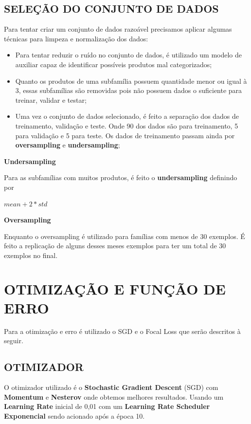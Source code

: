 \subsection{SELEÇÃO DO CONJUNTO DE DADOS}

Para tentar criar um conjunto de dados razoável precisamos aplicar algumas técnicas para limpeza e normalização dos dados:

\begin{itemize}
\item Para tentar reduzir o ruído no conjunto de dados, é utilizado um modelo de auxiliar capaz de identificar possíveis produtos mal categorizados;
\item Quanto os produtos de uma subfamília possuem quantidade menor ou igual à 3, essas subfamílias são removidas pois não possuem dados o suficiente para treinar, validar e testar;
\item Uma vez o conjunto de dados selecionado, é feito a separação dos dados de treinamento, validação e teste. Onde 90 dos dados são para treinamento, 5 para validação e 5 para teste. Os dados de treinamento passam ainda por \textbf{oversampling} e \textbf{undersampling};
\end{itemize}

\textbf{Undersampling}

Para as subfamílias com muitos produtos, é feito o \textbf{undersampling} definindo por

\begin{center}
    $mean + 2 * std$
\end{center}

\textbf{Oversampling}

Enquanto o oversampling é utilizado para famílias com menos de 30 exemplos. É feito a replicação de alguns desses meses exemplos para ter um total de 30 exemplos no final.

\section{OTIMIZAÇÃO E FUNÇÃO DE ERRO}

Para a otimização e erro é utilizado o SGD e o Focal Loss que serão descritos à seguir.

\subsection{OTIMIZADOR}

O otimizador utilizado é o \textbf{Stochastic Gradient Descent} (SGD) com \textbf{Momentum} e \textbf{Nesterov} onde obtemos melhores resultados. Usando um \textbf{Learning Rate} inicial de 0,01 com um \textbf{Learning Rate Scheduler Exponencial} sendo acionado após a época 10.

